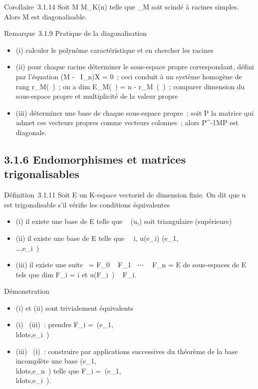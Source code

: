 \documentclass[]{article}
\begin{document}
Corollaire~3.1.14 Soit M \in M_K(n) telle que \chi_M soit
scindé à racines simples. Alors M est diagonalisable.

Remarque~3.1.9 Pratique de la diagonalisation

\begin{itemize}
\itemsep1pt\parskip0pt
\item
  (i) calculer le polynôme caractéristique et en chercher les racines
\item
  (ii) pour chaque racine déterminer le sous-espace propre
  correspondant, défini par l'équation (M - \lambda~I_n)X = 0~; ceci
  conduit à un système homogène de rang r_M(\lambda~)~; on a
  dim E_M(\lambda~) = n - r_M~(\lambda~)~;
  comparer dimension du sous-espace propre et multiplicité de la valeur
  propre
\item
  (iii) déterminer une base de chaque sous-espace propre~; soit P la
  matrice qui admet ces vecteurs propres comme vecteurs colonnes~; alors
  P^-1MP est diagonale.
\end{itemize}

\subsection{3.1.6 Endomorphismes et matrices trigonalisables}

Définition~3.1.11 Soit E un K-espace vectoriel de dimension finie. On
dit que u est trigonalisable s'il vérifie les conditions équivalentes

\begin{itemize}
\itemsep1pt\parskip0pt
\item
  (i) il existe une base  de E telle que
  \mathrmMat~ (u,) soit
  triangulaire (supérieure)
\item
  (ii) il existe une base  de E telle que \forall~~i,
  u(e_i)
  \in\mathrmVect(e_1,\\\ldots,e_i~)
\item
  (iii) il existe une suite \0\ =
  F_0 \subset~ F_1 \subset~⋯ \subset~
  F_n = E de sous-espaces de E tels que
  dim F_i = i et u(F_i~) \subset~
  F_i.
\end{itemize}

Démonstration

\begin{itemize}
\itemsep1pt\parskip0pt
\item
  (i) et (ii) sont trivialement équivalents
\item
  (i) \rigtharrow~(iii)~: prendre F_i =\
  \mathrmVect(e_1,\\ldots,e_i~)
\item
  (iii) \rigtharrow~(i)~: construire par applications successives du théorème de la
  base incomplète une base
  (e_1,\\ldots,e_n~)
  telle que F_i =\
  \mathrmVect(e_1,\\ldots,e_i~).
\end{itemize}
\end{document}
